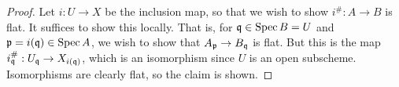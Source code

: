 \begin{proof}
	Let $i : U \to X$ be the inclusion map, so that we wish to show $i^\# : A \to B$ is flat. It suffices to show this locally. That is, for $\mathfrak{q} \in \operatorname{Spec} B = U$ and $\mathfrak{p} = i(\mathfrak{q}) \in \operatorname{Spec} A$, we wish to show that $A_{\mathfrak{p}} \to B_{\mathfrak{q}}$ is flat. But this is the map $i^\#_{\mathfrak{q}} : U_{\mathfrak{q}} \to X_{i(\mathfrak{q})}$, which is an isomorphism since $U$ is an open subscheme. Isomorphisms are clearly flat, so the claim is shown.
\end{proof}
